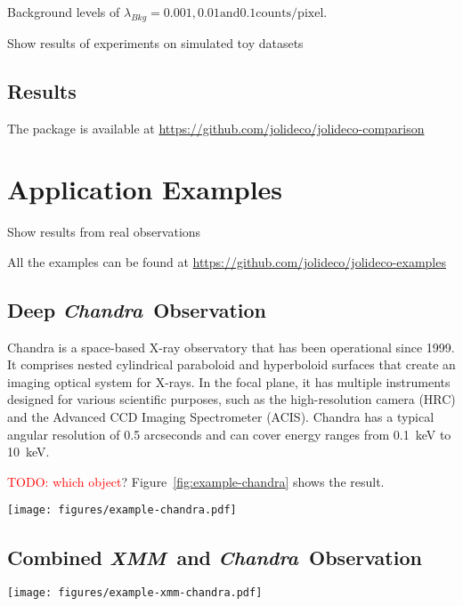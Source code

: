 \documentclass[twocolumn]{aastex631}
\newcommand{\chandra}{\textit{Chandra}~}
\newcommand{\xmm}{\textit{XMM}~}
\newcommand{\todo}[1]{\textcolor{red}{TODO: #1}\PackageWarning{TODO:}{#1!}}
\begin{document}
    Background levels of $\lambda_{Bkg}= 0.001, 0.01 \textrm{and} 0.1 \textrm{counts/pixel}$. 
    
    Show results of experiments on simulated toy datasets

    

    \subsection{Results}

    The package is available at \url{https://github.com/jolideco/jolideco-comparison}


    \section{Application Examples}
    Show results from real observations

    All the examples can be found at \url{https://github.com/jolideco/jolideco-examples}

    \subsection{Deep \chandra Observation}
    Chandra is a space-based X-ray observatory that has been operational since 1999. It comprises nested cylindrical paraboloid and hyperboloid surfaces that create an imaging optical system for X-rays. In the focal plane, it has multiple instruments designed for various scientific purposes, such as the high-resolution camera (HRC) and the Advanced CCD Imaging Spectrometer (ACIS). Chandra has a typical angular resolution of 0.5 arcseconds and can cover energy ranges from \qty[mode = text]{0.1}{keV} to  \qty[mode = text]{10}{keV}.

    \todo{which object}?
    Figure~\ref{fig:example-chandra} shows the result.
    
    \begin{figure*}[ht!]
        \begin{centering}
            \texttt{[image: figures/example-chandra.pdf]}
            \caption{
                Chandra Example
            }
            \label{fig:example-chandra}
        \end{centering}
    \end{figure*}


    \subsection{Combined \xmm and \chandra Observation}
    \begin{figure*}[ht!]
        \begin{centering}
            \texttt{[image: figures/example-xmm-chandra.pdf]}
            \caption{
                Chandra Example
            }
            \label{fig:example-xmm-chandra}
        \end{centering}
    \end{figure*}
\end{document}
